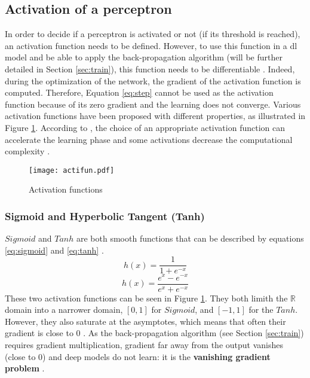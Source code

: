 \subsection{Activation of a perceptron} \label{subs:acti}
In order to decide if a perceptron is activated or not (if its threshold is reached), an activation function needs to be defined. However, to use this function in a \acrshort{dl} model and be able to apply the back-propagation algorithm (will be further detailed in Section \ref{sec:train}), this function needs to be differentiable \cite{lecun_backpropagation_1989}. Indeed, during the optimization of the network, the gradient of the activation function is computed. Therefore, Equation \ref{eq:step} cannot be used as the activation function because of its zero gradient and the learning does not converge.  Various activation functions have been proposed with different properties, as illustrated in Figure \ref{fig:acti}. According to \textcite{khan_survey_2020}, the choice of an appropriate activation function can accelerate the learning phase and some activations decrease the computational complexity \cite{krizhevsky_imagenet_2012}.
%
\begin{figure}
    \centering
    \texttt{[image: actifun.pdf]}
    \caption{Activation functions}
    \label{fig:acti}
\end{figure}
%
\subsubsection{Sigmoid and Hyperbolic Tangent (Tanh)}
$Sigmoid$ and $Tanh$ are both smooth functions that can be described by equations \eqref{eq:sigmoid} and \eqref{eq:tanh} \cite{krizhevsky_imagenet_2012}.
%
\begin{equation}
    h(x) = \frac{1}{1 + e^{-x}}
    \label{eq:sigmoid}
\end{equation}
%
\begin{equation}
    h(x) = \frac{e^{x} - e^{-x}}{e^{x} + e^{-x}}
    \label{eq:tanh}
\end{equation}
%
These two activation functions can be seen in Figure \ref{fig:acti}. They both limith the $\mathbb{R}$ domain into a narrower domain, $[0, 1]$ for $Sigmoid$, and $[-1, 1]$ for the $Tanh$. However, they also saturate at the asymptotes, which means that often their gradient is close to 0 \cite{glorot_understanding_2010}. As the back-propagation algorithm (see Section \ref{sec:train}) requires gradient multiplication, gradient far away from the output vanishes (close to 0) and deep models do not learn: it is the \textbf{vanishing gradient problem} \cite{goodfellow_deep_2016, khan_survey_2020, maas_rectier_2014}.
%
